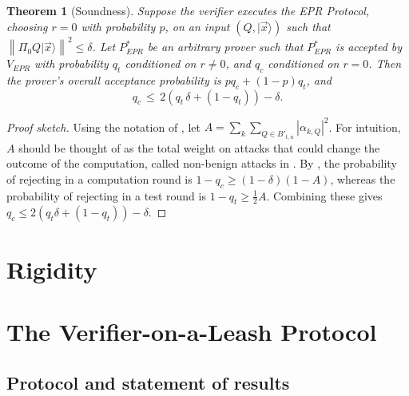 \documentclass[11pt,letter]{article}
\newtheorem{theorem}{Theorem}
\theoremstyle{remark}
\theoremstyle{definition}
\newcommand{\ket}[1]{|#1\rangle}
\newcommand{\anote}[1]{\textcolor{blue}{\small {\textbf{(Andrea:} #1 \textbf{) }}}}
\newcommand{\norm}[1]{\left\|#1\right\|}
\begin{document}
\begin{theorem}[Soundness]\label{thm:EPR-soundness} 
Suppose the verifier executes the EPR Protocol, choosing $r=0$ with probability $p$, on an input $(Q,\ket{\vec{x}})$ such that $\norm{\Pi_0 Q\ket{\vec{x}}}^2\leq \delta$. Let $P_{EPR}^*$ be an arbitrary prover such that $P_{EPR}^*$ is accepted by  $V_{EPR}$ with probability $q_t$ conditioned on $r\neq 0$, and $q_c$ conditioned on $r=0$. Then the prover's overall acceptance probability is $pq_c+(1-p)q_t$, and
$$q_c \,\leq\, 2\left(q_t\,\delta+(1-q_t)\right)-\delta.$$ 
\end{theorem}
\begin{proof}[Proof sketch]
Using the notation of \cite{broadbent15howtoverify}, let $A=\sum_k\sum_{Q\in B'_{t,n}}|\alpha_{k,Q}|^2$. For intuition, $A$ should be thought of as the total weight on attacks that could change the outcome of the computation, called non-benign attacks in \cite{broadbent15howtoverify}. By \cite{broadbent15howtoverify}, the probability of rejecting in a computation round is $1-q_c\geq (1-\delta)(1-A)$, whereas the probability of rejecting in a test round is $1-q_t\geq \frac{1}{2}A$. Combining these gives $q_c\leq 2(q_t\delta+(1-q_t))-\delta$.
\end{proof}






\section{Rigidity}
\label{sec:rigidity}






\section{The Verifier-on-a-Leash Protocol}
\label{sec:leash}




\subsection{Protocol and statement of results}
\end{document}
